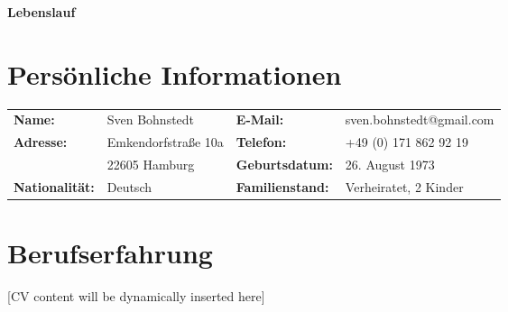 \documentclass[a4paper,11pt]{article}
\begin{document}
\begin{center}
    {\Huge\bfseries Lebenslauf}
\end{center}

\section*{Persönliche Informationen}
\begin{tabularx}{\textwidth}{@{}l X l X@{}}
    \textbf{Name:} & Sven Bohnstedt & \textbf{E-Mail:} & sven.bohnstedt@gmail.com \\
    \textbf{Adresse:} & Emkendorfstraße 10a & \textbf{Telefon:} & +49 (0) 171 862 92 19 \\
    & 22605 Hamburg & \textbf{Geburtsdatum:} & 26. August 1973 \\
    \textbf{Nationalität:} & Deutsch & \textbf{Familienstand:} & Verheiratet, 2 Kinder
\end{tabularx}

\section{Berufserfahrung}

[CV content will be dynamically inserted here]
\end{document}
